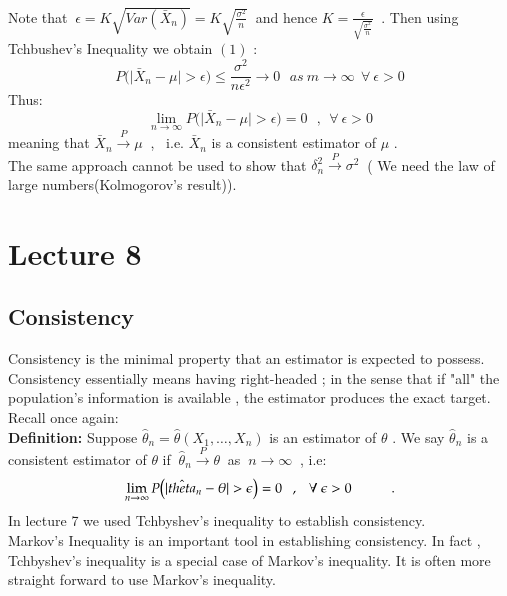 \documentclass[14pt,twoside,a4paper,fleqn]{article}
\theoremstyle{plain}
\begin{document}
Note that $\ \epsilon = K\sqrt{Var(\bar{X}_n)}=K\sqrt{\frac{\sigma^2}{n}}\ $ and hence $K=\frac{\epsilon}{\sqrt{\frac{\sigma^2}{n}}}\ $ . Then using Tchbushev's Inequality we obtain $(1)$ :
$$
	P\big(\vert \bar{X}_n - \mu\vert > \epsilon\big) \leq \frac{\sigma^2}{n \epsilon^2} \to 0 \ \ \ as\ m\to\infty\ \ \forall\ \epsilon > 0
$$
Thus:
$$
	\lim\limits_{n\to\infty} P\big(\vert \bar{X}_n - \mu\vert > \epsilon\big) = 0\ \ \ ,\ \ \forall\ \epsilon>0
$$
meaning that $\bar{X}_n\xrightarrow{P}\mu\ $ , \ i.e. $\bar{X}_n$ is a consistent estimator of $\mu$ .\\
The same approach cannot be used to show that $\delta^2_n\xrightarrow{P}\sigma^2\ $ ( We need the law of large numbers(Kolmogorov's result)).



\newpage
\section{Lecture 8}
\subsection{Consistency}
Consistency is the minimal property that an estimator is expected to possess. Consistency essentially means having right-headed ; in the sense that if "all" the population's information is available , the estimator produces the exact target. Recall once again:\\
\textbf{Definition: } Suppose $\hat{\theta}_n = \hat{\theta}(X_1,\ldots,X_n)$ is an estimator of $\theta$ . We say $\hat{\theta}_n$ is a consistent estimator of $\theta$ if \mbox{$\ \hat{\theta}_n\xrightarrow{P}\theta\ $} as $\ n\to\infty\ $ , i.e:
$$
	\lim\limits_{n\to\infty} P\big(\vert\hat{theta}_n - \theta\vert > \epsilon\big) = 0\ \ \ ,\ \ \ \forall\ \epsilon>0\tab .
$$
In lecture 7 we used Tchbyshev's inequality to establish consistency.\\
Markov's Inequality is an important tool in establishing consistency. In fact , Tchbyshev's inequality is a special case of Markov's inequality. It is often more straight forward to use Markov's inequality.\\
\end{document}
